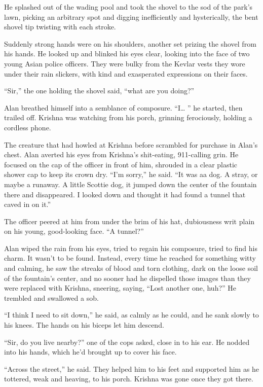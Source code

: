 He splashed out of the wading pool and took the shovel to the sod of
the park's lawn, picking an arbitrary spot and digging inefficiently
and hysterically, the bent shovel tip twisting with each stroke.

Suddenly strong hands were on his shoulders, another set prizing the
shovel from his hands.  He looked up and blinked his eyes clear,
looking into the face of two young Asian police officers.  They were
bulky from the Kevlar vests they wore under their rain slickers, with
kind and exasperated expressions on their faces.

``Sir,'' the one holding the shovel said, ``what are you doing?''

Alan breathed himself into a semblance of composure.  ``I\ldots{}  '' he
started, then trailed off.  Krishna was watching from his porch,
grinning ferociously, holding a cordless phone.

The creature that had howled at Krishna before scrambled for purchase
in Alan's chest.  Alan averted his eyes from Krishna's shit-eating,
911-calling grin.  He focused on the cap of the officer in front of
him, shrouded in a clear plastic shower cap to keep its crown dry. 
``I'm sorry,'' he said.  ``It was a\dash{}a dog.  A stray, or maybe a
runaway.  A little Scottie dog, it jumped down the center of the
fountain there and disappeared.  I looked down and thought it had
found a tunnel that caved in on it.''

The officer peered at him from under the brim of his hat, dubiousness
writ plain on his young, good-looking face.  ``A tunnel?''

Alan wiped the rain from his eyes, tried to regain his composure,
tried to find his charm.  It wasn't to be found.  Instead, every time
he reached for something witty and calming, he saw the streaks of
blood and torn clothing, dark on the loose soil of the fountain's
center, and no sooner had he dispelled those images than they were
replaced with Krishna, sneering, saying, ``Lost another one, huh?'' He
trembled and swallowed a sob.

``I think I need to sit down,'' he said, as calmly as he could, and he
sank slowly to his knees.  The hands on his biceps let him descend.

``Sir, do you live nearby?'' one of the cops asked, close in to his
ear.  He nodded into his hands, which he'd brought up to cover his
face.

``Across the street,'' he said.  They helped him to his feet and
supported him as he tottered, weak and heaving, to his porch.  Krishna
was gone once they got there.

